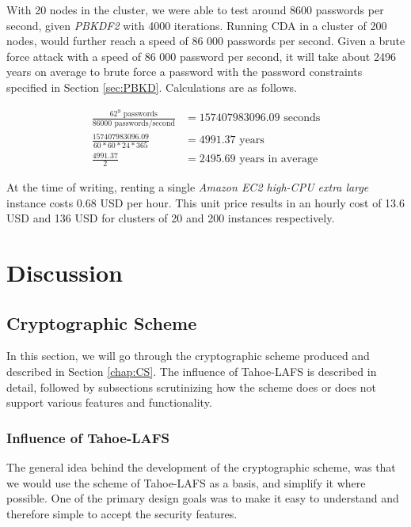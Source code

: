\documentclass[pdftex,english,10pt,b5paper,twoside]{book}
\begin{document}
With 20 nodes in the cluster, we were able to test around 8600 passwords per
second, given \emph{PBKDF2} with 4000 iterations. Running \ac{CDA} in a cluster
of 200 nodes, would further reach a speed of 86 000 passwords per second. Given
a brute force attack with a speed of 86 000 password per second, it will take
about 2496 years on average to brute force a password with the password
constraints specified in Section \ref{sec:PBKD}. Calculations are as follows.

\begin{align*}
\frac{62^9 \text{ passwords}}{86000 \text{ passwords/second}} &= 157407983096.09 \text{ seconds} \\
\frac{157407983096.09}{60 * 60 * 24 * 365} &= 4991.37 \text{ years} \\
\frac{4991.37}{2} &= 2495.69 \text{ years in average}
\end{align*}

At the time of writing, renting a single \emph{Amazon EC2 high-CPU extra large}
instance costs 0.68 USD per hour. This unit price results in an hourly cost of
13.6 USD and 136 USD for clusters of 20 and 200 instances respectively. 

\chapter{Discussion}
\label{ch:discussion}


\section{Cryptographic Scheme}

In this section, we will go through the cryptographic scheme produced and
described in Section \ref{chap:CS}. The influence of Tahoe-\ac{LAFS} is
described in detail, followed by subsections scrutinizing how the scheme does
or does not support various features and functionality.

\subsection{Influence of Tahoe-LAFS}

The general idea behind the development of the cryptographic scheme, was that
we would use the scheme of Tahoe-\ac{LAFS} as a basis, and simplify it where
possible. One of the primary design goals was to make it easy to
understand and therefore simple to accept the security features.
\end{document}
